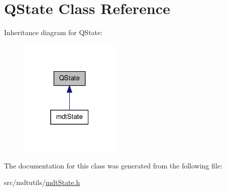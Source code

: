\hypertarget{class_q_state}{\section{Q\-State Class Reference}
\label{class_q_state}
}


Inheritance diagram for Q\-State\-:\nopagebreak
\begin{figure}[H]
\begin{center}
\leavevmode
\includegraphics[width=136pt]{class_q_state__inherit__graph}
\end{center}
\end{figure}


The documentation for this class was generated from the following file\-:\begin{DoxyCompactItemize}
\item 
src/mdtutils/\hyperlink{mdt_state_8h}{mdt\-State.\-h}\end{DoxyCompactItemize}
